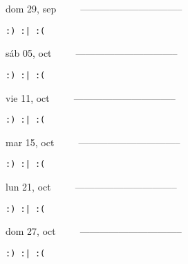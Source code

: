 \documentclass[letterpaper,10pt]{article}
\begin{document}
\begin{multicols}{3}
{dom 29, sep\ \ \ \ \ --------------------------------}
\begin{flushright}\begin{small}\texttt{:) :| :(}\end{small}\end{flushright}
\vfill
{sáb 05, oct\ \ \ \ \ --------------------------------}
\begin{flushright}\begin{small}\texttt{:) :| :(}\end{small}\end{flushright}\par
\vfill
{vie 11, oct\ \ \ \ \ --------------------------------}
\begin{flushright}\begin{small}\texttt{:) :| :(}\end{small}\end{flushright}\par
\vfill
\end{multicols}
\vspace{1.05cm}

\begin{multicols}{3}
{mar 15, oct\ \ \ \ \ --------------------------------}
\begin{flushright}\begin{small}\texttt{:) :| :(}\end{small}\end{flushright}
\vfill
{lun 21, oct\ \ \ \ \ --------------------------------}
\begin{flushright}\begin{small}\texttt{:) :| :(}\end{small}\end{flushright}\par
\vfill
{dom 27, oct\ \ \ \ \ --------------------------------}
\begin{flushright}\begin{small}\texttt{:) :| :(}\end{small}\end{flushright}\par
\vfill
\end{multicols}
\vspace{1.05cm}
\end{document}
